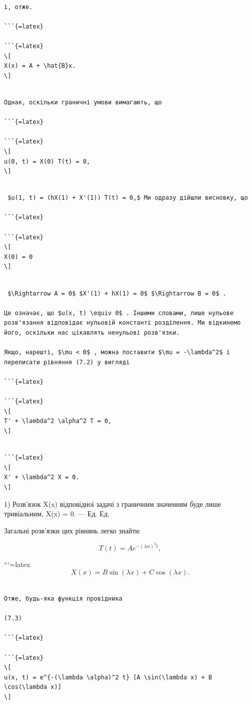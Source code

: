 \documentclass[
]{article}
\begin{document}
\begin{verbatim}

і, отже.

```{=latex}

```{=latex}
\[
X(x) = A + \hat{B}x.
\]
\end{verbatim}

\begin{verbatim}

Однак, оскільки граничні умови вимагають, що

```{=latex}

```{=latex}
\[
u(0, t) = X(0) T(t) = 0,
\]
\end{verbatim}

\begin{verbatim}

 $u(1, t) = (hX(1) + X'(1)) T(t) = 0,$ Ми одразу дійшли висновку, що

```{=latex}

```{=latex}
\[
X(0) = 0
\]
\end{verbatim}

\begin{verbatim}

 $\Rightarrow A = 0$ $X'(1) + hX(1) = 0$ $\Rightarrow B = 0$ .

Це означає, що $u(x, t) \equiv 0$ . Іншими словами, лише нульове розв'язання відповідає нульовій константі розділення. Ми відкинемо його, оскільки нас цікавлять ненульові розв'язки.

Якщо, нарешті, $\mu < 0$ , можна поставити $\mu = -\lambda^2$ і переписати рівняння (7.2) у вигляді

```{=latex}

```{=latex}
\[
T' + \lambda^2 \alpha^2 T = 0,
\]
\end{verbatim}

\begin{verbatim}

```{=latex}
\[
X' + \lambda^2 X = 0.
\]
\end{verbatim}

1) Розв'язок X(x) відповідної задачі з граничним значенням буде лише
тривіальним, X(x) = 0. --- Ед. Ед.

Загальні розв'язки цих рівнянь легко знайти:

\[
T(t) = Ae^{-(\lambda \alpha)^2 t},
\]

```{=latex}
\[
X(x) = B\sin(\lambda x) + C\cos(\lambda x).
\]

\begin{verbatim}

Отже, будь-яка функція провідника

(7.3)

```{=latex}

```{=latex}
\[
u(x, t) = e^{-(\lambda \alpha)^2 t} [A \sin(\lambda x) + B \cos(\lambda x)]
\]
\end{verbatim}
\end{document}
